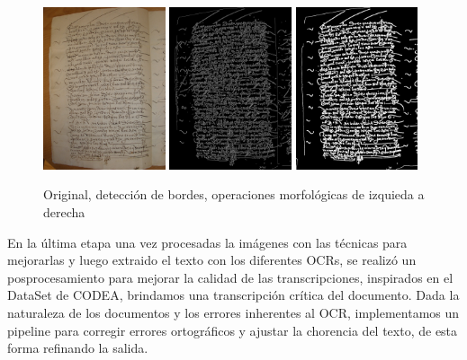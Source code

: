 \documentclass[11pt,a4paper]{article}
\begin{document}
\begin{figure}[h] \centering \begin{minipage}{1.0\textwidth} \includegraphics[width=0.32\textwidth]{CODEA-0205_2v.jpg} \includegraphics[width=0.32\textwidth]{canny_image_aftergauss_eq2.png} \includegraphics[width=0.32\textwidth]{photo_2025-01-27_21-34-01.jpg} \caption{Original, detecci\'on de bordes, operaciones morfol\'ogicas de izquieda a derecha} \label{fig:tresfotos} \end{minipage} \end{figure}

En la \'ultima etapa una vez procesadas la im\'agenes con las t\'ecnicas para mejorarlas y luego extraido el texto con los diferentes OCRs, se realiz\'o un posprocesamiento para mejorar la calidad de las transcripciones, inspirados en el DataSet de CODEA, brindamos una transcripción cr\'itica del documento. Dada la naturaleza de los documentos y los errores inherentes al OCR, implementamos un pipeline para corregir errores ortogr\'aficos y ajustar la chorencia del texto, de esta forma refinando la salida.
\end{document}
